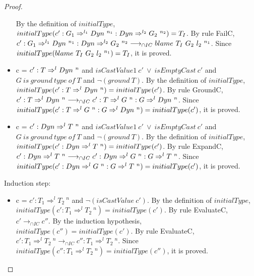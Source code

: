 \documentclass[a4paper]{article}
\begin{document}
\begin{proof}
\begin{itemize}
    By the definition of $initialType$, $initialType(c' : G_1 \Rightarrow^{l_1} \Dyn\ ^{n_1} : \Dyn \Rightarrow^{l_2} G_2\ ^{n_2}) = T_I$.
    By rule FailC, $c' : G_1 \Rightarrow^{l_1} \Dyn\ ^{n_1} : \Dyn \Rightarrow^{l_2} G_2\ ^{n_2} \longrightarrow_{\cap IC} \blamecast{T_I}{G_2}{l_2}{n_1}$.
    Since $initialType(blame\ T_I\ G_2\ l_2\ ^{n_1}) = T_I$, it is proved.
    \item c = $c' : T \Rightarrow^l \Dyn\ ^n$ and $isCastValue1\ c'\ \lor\ isEmptyCast\ c'$ and $G\ is\ ground\ type\ of\ T$ and $\neg(ground\ T)$.
    By the definition of $initialType$, $initialType(c' : T \Rightarrow^l Dyn\ ^n) = initialType(c')$.
    By rule GroundC, $c' : T \Rightarrow^l Dyn\ ^n \longrightarrow_{\cap IC} c' : T \Rightarrow^l G\ ^n : G \Rightarrow^l Dyn\ ^n$.
    Since $initialType(c' : T \Rightarrow^l G\ ^n : G \Rightarrow^l Dyn\ ^n) = initialType(c')$, it is proved.
    \item c = $c' : \Dyn \Rightarrow^l T\ ^n$ and $isCastValue1\ c'\ \lor\ isEmptyCast\ c'$ and $G\ is\ ground\ type\ of\ T$ and $\neg(ground\ T)$.
    By the definition of $initialType$, $initialType(c' : Dyn \Rightarrow^l T\ ^n) = initialType(c')$.
    By rule ExpandC, $c' : Dyn \Rightarrow^l T\ ^n \longrightarrow_{\cap IC} c' : Dyn \Rightarrow^l G\ ^n : G \Rightarrow^l T\ ^n$.
    Since $initialType(c' : Dyn \Rightarrow^l G\ ^n : G \Rightarrow^l T\ ^n) = initialType(c')$, it is proved.
    \begin{comment}
    \item c = $c' : T_1 \Rightarrow^l T_2\ ^n$ and $isCastValue1\ c'\ \lor\ isEmptyCast\ c'$ and $initialType(c') = T_I$.
    By the definition of $initialType$, $initialType(c' : T_1 \Rightarrow^l T_2\ ^n) = T_I$.
    By rule TriggerStuckC, $c' : T_1 \Rightarrow^l T_2\ ^n \longrightarrow_{\cap IC} \stuckcast{T_I}{T_2}{n}$.
    Since $initialType(\stuckcast{T_I}{T_2}{n}) = T_I$, it is proved.
    \end{comment}
\end{itemize}
Induction step:
\begin{itemize}
    \item c = $c' : T_1 \Rightarrow^l T_2\ ^n$ and $\neg(isCastValue\ c')$.
    By the definition of $initialType$, $initialType(c' : T_1 \Rightarrow^l T_2\ ^n) = initialType(c')$.
    By rule EvaluateC, $c' \longrightarrow_{\cap IC} c''$.
    By the induction hypothesis, $initialType(c'') = initialType(c')$.
    By rule EvaluateC, $c' : T_1 \Rightarrow^l T_2\ ^n \longrightarrow_{\cap IC} c'' : T_1 \Rightarrow^l T_2\ ^n$.
    Since $initialType(c'' : T_1 \Rightarrow^l T_2\ ^n) = initialType(c'')$, it is proved.
\end{itemize}
\end{proof}
\end{document}

